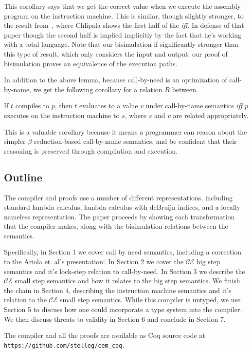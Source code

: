 This corollary says that we get the correct value when we execute the assembly
program on the instruction machine. This is similar, though slightly stronger,
to the result from~\cite{chlipala2007certified}, where Chlipala shows the first
half of the \emph{iff}. In defense of that paper though the second half is
implied implicitly by the fact that he's working with a total language. Note
that our bisimulation if significantly stronger than this type of result, which
only considers the input and output: our proof of bisimulation proves an
equivalence of the execution paths.

In addition to the above lemma, because call-by-need is an optimization of
call-by-name, we get the following corollary for a relation $R$ between.

\begin{corollary}
If $t$ compiles to $p$, then $t$ evaluates to a value $v$ under call-by-name
semantics \emph{iff} $p$ executes on the instruction machine to $s$, where $s$
and $v$ are related appropriately.
\end{corollary}

This is a valuable corollary because it means a programmer can reason about the
simpler $\beta$ reduction-based call-by-name semantics, and be confident that
their reasoning is preserved through compilation and execution.

\subsection{Outline}
The compiler and proofs use a number of different representations, including
standard lambda calculus, lambda calculus with deBruijn indices, and a locally
nameless representation. The paper proceeds by showing each transformation that
the compiler makes, along with the bisimulation relations between the semantics.

Specifically, in Section 1 we cover call by need semantics, including a
correction to the Ariola et. al's presentation`\cite{ariola1995call}. In Section
2 we cover the $\mathcal{CE}$ big step semantics and it's lock-step relation to
call-by-need.  In Section 3 we describe the $\mathcal{CE}$ small step semantics
and how it relates to the big step semantics. We finish the chain in Section 4,
describing the instruction machine semantics and it's relation to the
$\mathcal{CE}$ small step semantics. While this compiler is untyped, we use
Section 5 to discuss how one could incorporate a type system into the compiler.
We then discuss threats to validity in Section 6 and conclude in Section 7. 

The compiler and all the proofs are available as Coq source code at
\texttt{https://github.com/stelleg/cem\_coq}.

